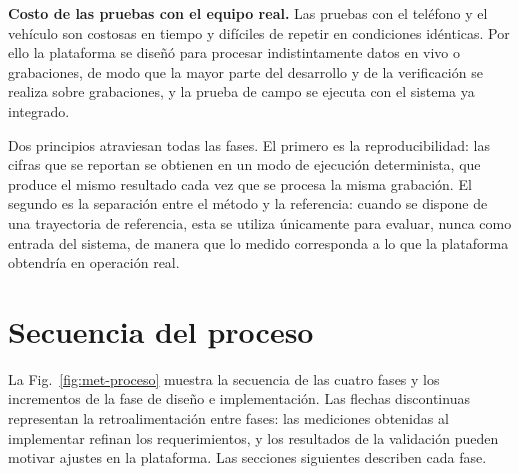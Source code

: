 \textbf{Costo de las pruebas con el equipo real.}
Las pruebas con el teléfono y el vehículo son costosas en tiempo y difíciles de repetir en condiciones idénticas.
Por ello la plataforma se diseñó para procesar indistintamente datos en vivo o grabaciones, de modo que la mayor parte del desarrollo y de la verificación se realiza sobre grabaciones, y la prueba de campo se ejecuta con el sistema ya integrado.

Dos principios atraviesan todas las fases.
El primero es la reproducibilidad: las cifras que se reportan se obtienen en un modo de ejecución determinista, que produce el mismo resultado cada vez que se procesa la misma grabación.
El segundo es la separación entre el método y la referencia: cuando se dispone de una trayectoria de referencia, esta se utiliza únicamente para evaluar, nunca como entrada del sistema, de manera que lo medido corresponda a lo que la plataforma obtendría en operación real.

\section{Secuencia del proceso}
\label{sec:met-proceso}

La Fig.~\ref{fig:met-proceso} muestra la secuencia de las cuatro fases y los incrementos de la fase de diseño e implementación.
Las flechas discontinuas representan la retroalimentación entre fases: las mediciones obtenidas al implementar refinan los requerimientos, y los resultados de la validación pueden motivar ajustes en la plataforma.
Las secciones siguientes describen cada fase.

